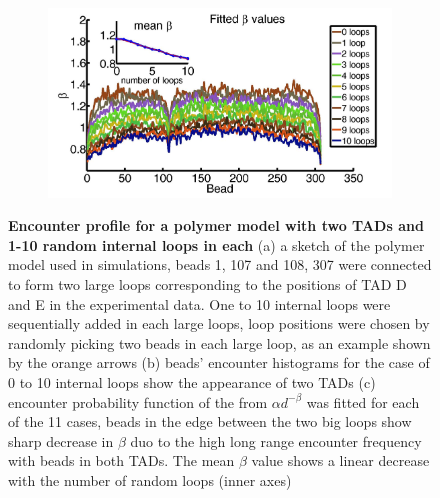 \documentclass[12pt]{article}
\begin{document}
\begin{figure}[H]
\begin{subfigure}[b]{0.12\textwidth}
\includegraphics[scale=0.15]{fittedExpTwoFixedLoop1To10RandomLoops307Beads}
\caption{}
\end{subfigure}
\caption{\textbf{Encounter profile for a polymer model with two TADs and 1-10 random internal loops in each} (a) a sketch of the polymer model used in simulations, beads 1, 107 and 108, 307 were connected to form two large loops corresponding to the positions of TAD D and E in the experimental data. One to 10 internal loops were sequentially added in each large loops, loop positions were chosen by randomly picking two beads in each large loop, as an example shown by the orange arrows (b) beads' encounter histograms for the case of 0 to 10 internal loops show the appearance of two TADs (c) encounter probability function of the from $\alpha d^{-\beta}$ was fitted for each of the 11 cases, beads in the edge between the two big loops show sharp decrease in $\beta$ duo to the high long range encounter frequency with beads in both TADs. The mean $\beta$ value shows a linear decrease with the number of random loops (inner axes)}
\label{figure_encounterProfileTwoTADs}

\end{figure}



\end{document}
